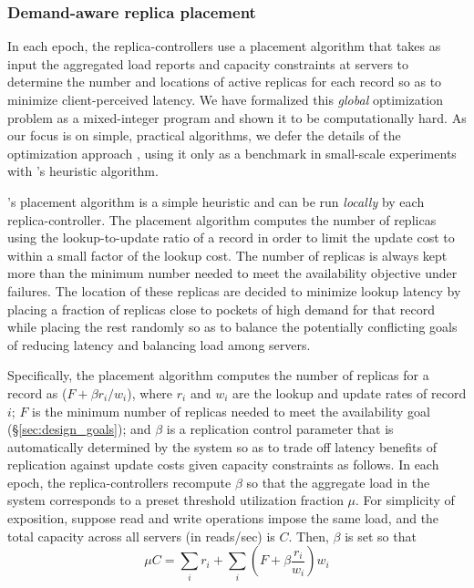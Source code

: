 \subsubsection{Demand-aware replica placement} 
\label{sec:placement}

In each epoch, the replica-controllers use a {placement algorithm} that takes as input the aggregated load reports and capacity constraints at servers to determine the number and locations of active replicas for each record so as to minimize client-perceived latency. We have formalized this {\em global} optimization problem as a mixed-integer program and shown it to be computationally hard.  As our focus is on simple, practical algorithms, we defer the details of the optimization approach \cite{techreport}, using it only as a benchmark in small-scale experiments with \auspice's heuristic algorithm.


\auspice's placement algorithm is a simple heuristic  and can be run {\em locally} by each replica-controller. The placement algorithm computes the number of replicas using the lookup-to-update ratio of a record in order to limit the update cost to within a small factor of the lookup cost. The number of replicas is always kept more than the minimum number needed to meet the availability objective under failures.   The location of these replicas are decided to minimize lookup latency by placing a fraction of replicas close to pockets of high demand for that record while placing the rest randomly so as to balance the potentially conflicting goals of reducing latency and balancing load among servers.



Specifically, the placement algorithm computes the number of replicas for a record as ($F+ \beta r_i/w_i$), where $r_i$ and $w_i$ are the lookup and update rates of record $i$; $F$ is the minimum number of replicas needed to meet the availability goal (\S \ref{sec:design_goals}); and $\beta$ is a replication control parameter that is automatically determined by the system so as to trade off latency benefits of replication against update costs given capacity constraints as follows. In each epoch, the replica-controllers recompute $\beta$ so that the aggregate load in the system corresponds to a preset threshold utilization fraction $\mu$. For simplicity of exposition, suppose read and write operations impose the same load, and the total capacity across all servers (in reads/sec) is $C$. Then, $\beta$ is set so that  
\vsp
\begin{equation}
\mu C = \sum_i r_i  + \sum_i (F + \beta  \frac{r_i}{w_i}) w_i
\label{eq:mu}
\end{equation}
\vsp
\vsp

